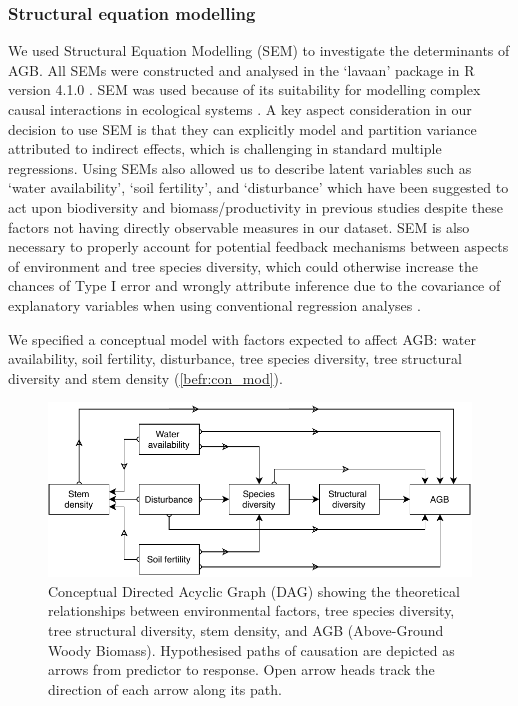 \begin{refsection}
\subsubsection{Structural equation modelling}
\label{befr:sssec:sem}

We used Structural Equation Modelling (SEM) to investigate the determinants of AGB. All SEMs were constructed and analysed in the `lavaan' package \citep{lavaan} in R version 4.1.0 \citep{R2020}. SEM was used because of its suitability for modelling complex causal interactions in ecological systems \citep{Lee2007}. A key aspect consideration in our decision to use SEM is that they can explicitly model and partition variance attributed to indirect effects, which is challenging in standard multiple regressions. Using SEMs also allowed us to describe latent variables such as `water availability', `soil fertility', and `disturbance' which have been suggested to act upon biodiversity and biomass/productivity in previous studies despite these factors not having directly observable measures in our dataset. SEM is also necessary to properly account for potential feedback mechanisms between aspects of environment and tree species diversity, which could otherwise increase the chances of Type I error and wrongly attribute inference due to the covariance of explanatory variables when using conventional regression analyses \citep{Nachtigall2003}.

We specified a conceptual model with factors expected to affect AGB: water availability, soil fertility, disturbance, tree species diversity, tree structural diversity and stem density (\autoref{befr:con_mod}). 

\begin{figure}
\includegraphics[width=\linewidth]{img/concept.drawio}
\caption[Conceptual model path diagram]{Conceptual Directed Acyclic Graph (DAG) showing the theoretical relationships between environmental factors, tree species diversity, tree structural diversity, stem density, and AGB (Above-Ground Woody Biomass). Hypothesised paths of causation are depicted as arrows from predictor to response. Open arrow heads track the direction of each arrow along its path.}
	\label{befr:con_mod}
\end{figure}


\end{refsection}
